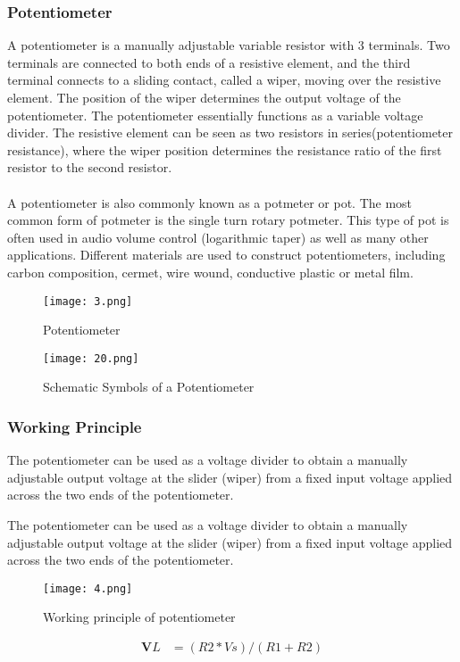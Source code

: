 \documentclass[12pt,a4paper]{article}
\begin{document}
\begin{center}
\begin{center}
\subsubsection*{Potentiometer}
A potentiometer is a manually adjustable variable resistor with 3 terminals. Two terminals are connected to both ends of a resistive element, and the third terminal connects to a sliding contact, called a wiper, moving over the resistive element. The position of the wiper determines the output voltage of the potentiometer. The potentiometer essentially functions as a variable voltage divider. The resistive element can be seen as two resistors in series(potentiometer resistance), where the wiper position determines the resistance ratio of the first resistor to the second resistor.\\
\\
A potentiometer is also commonly known as a potmeter or pot. The most common form of potmeter is the single turn rotary potmeter. This type of pot is often used in audio volume control (logarithmic taper) as well as many other applications. Different materials are used to construct potentiometers, including carbon composition, cermet, wire wound, conductive plastic or metal film.
\begin{figure}[H]
	\centering 
	\texttt{[image: 3.png]}
	\caption{Potentiometer}	
\end{figure}
\begin{figure}[H]
	\centering 
	\texttt{[image: 20.png]}
	\caption{Schematic Symbols of a Potentiometer}	
\end{figure}

\subsubsection*{Working Principle}
The potentiometer can be used as a voltage divider to obtain a manually adjustable output voltage at the slider (wiper) from a fixed input voltage applied across the two ends of the potentiometer. 

The potentiometer can be used as a voltage divider to obtain a manually adjustable output voltage at the slider (wiper) from a fixed input voltage applied across the two ends of the potentiometer. 
\begin{figure}[H]
	\centering 
	\texttt{[image: 4.png]}
	\caption{Working principle of potentiometer }	
\end{figure}
\begin{align}
\textbf{V}L&=(R2*Vs)/(R1+R2)
\end{align}

\end{center}
\end{center}
\end{document}
